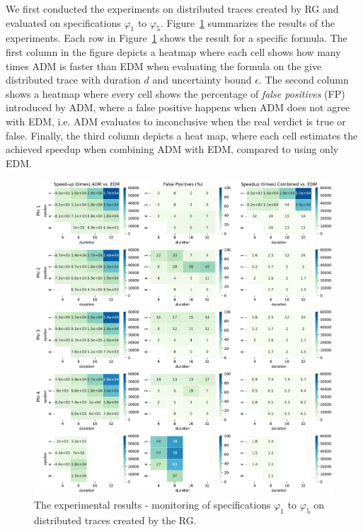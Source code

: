 We first conducted the experiments on distributed traces created by RG and evaluated on specifications $\varphi_1$ to $\varphi_5$. Figure~\ref{fig:rgresults} summarizes the results of the experiments. Each row in Figure~\ref{fig:rgresults} shows the result for a specific formula. The first column in the figure depicts a heatmap where each cell shows how many times ADM is faster than EDM when evaluating the formula on the give distributed trace with duration $d$ and uncertainty bound $\epsilon$. The second column shows a heatmap where every cell shows the percentage of \emph{false positives} (FP) introduced by ADM, where a false positive happens when ADM does not agree with EDM, i.e. ADM evaluates to inconclusive when the real verdict is true or false. Finally, the third column depicts a heat map, where each cell estimates the achieved speedup when combining ADM with EDM, compared to using only EDM.

\begin{figure}
	\begin{center}
	\includegraphics[width=\linewidth]{speedup}
\caption{The experimental results - monitoring of specifications $\varphi_{1}$ to $\varphi_{5}$ on distributed traces created by the RG.}
\label{fig:rgresults}
\end{center}
\end{figure}

